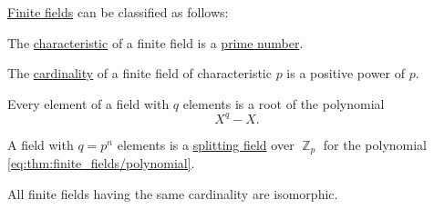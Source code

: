 \begin{theorem}\label{thm:finite_fields}
  \hyperref[def:finite_field]{Finite fields} can be classified as follows:
  \begin{thmenum}
     The \hyperref[def:ring_characteristic]{characteristic} of a finite field is a \hyperref[def:prime_number]{prime number}.

     The \hyperref[thm:cardinality_existence]{cardinality} of a finite field of characteristic \( p \) is a positive power of \( p \).

     Every element of a field with \( q \) elements is a root of the polynomial
    \begin{equation}\label{eq:thm:finite_fields/polynomial}
      X^q - X.
    \end{equation}

     A field with \( q = p^n \) elements is a \hyperref[def:splitting_field]{splitting field} over \( \BbbZ_p \) for the polynomial \eqref{eq:thm:finite_fields/polynomial}.

     All finite fields having the same cardinality are isomorphic.
  \end{thmenum}
\end{theorem}
